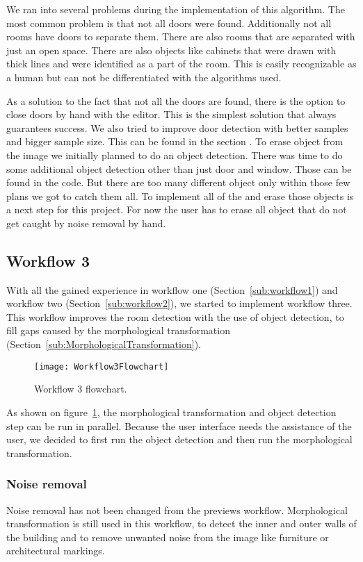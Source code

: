 We ran into several problems during the implementation of this algorithm. The most common problem is that not all doors were found. Additionally not all rooms have doors to separate them. There are also rooms that are separated with just an open space. There are also objects like cabinets that were drawn with thick lines and were identified as a part of the room. This is easily recognizable as a human but can not be differentiated with the algorithms used.

As a solution to the fact that not all the doors are found, there is the option to close doors by hand with the editor. This is the simplest solution that always guarantees success. We also tried to improve door detection with better samples and bigger sample size. This can be found in the section .
To erase object from the image we initially planned to do an object detection. There was time to do some additional object detection other than just door and window. Those can be found in the code. But there are too many different object only within those few plans we got to catch them all. To implement all of the and erase those objects is a next step for this project. For now the user has to erase all object that do not get caught by noise removal by hand.


\subsection{Workflow 3}
\label{sub:workflow3}
With all the gained experience in workflow one (Section~\ref{sub:workflow1}) and workflow two (Section~\ref{sub:workflow2}), we started to implement workflow three. This workflow improves the room detection with the use of object detection, to fill gaps caused by the morphological transformation (Section~\ref{sub:MorphologicalTransformation}).

\begin{figure}[H]
	\centering
	\texttt{[image: Workflow3Flowchart]}
	\caption{Workflow 3 flowchart.}
	\label{fig:Workflow3Flowchart}
\end{figure}

As shown on figure~\ref{fig:Workflow3Flowchart}, the morphological transformation and object detection step can be run in parallel. Because the user interface needs the assistance of the user, we decided to first run the object detection and then run the morphological transformation.

\subsubsection{Noise removal}
Noise removal has not been changed from the previews workflow. Morphological transformation is still used in this workflow, to detect the inner and outer walls of the building and to remove unwanted noise from the image like furniture or architectural markings.

